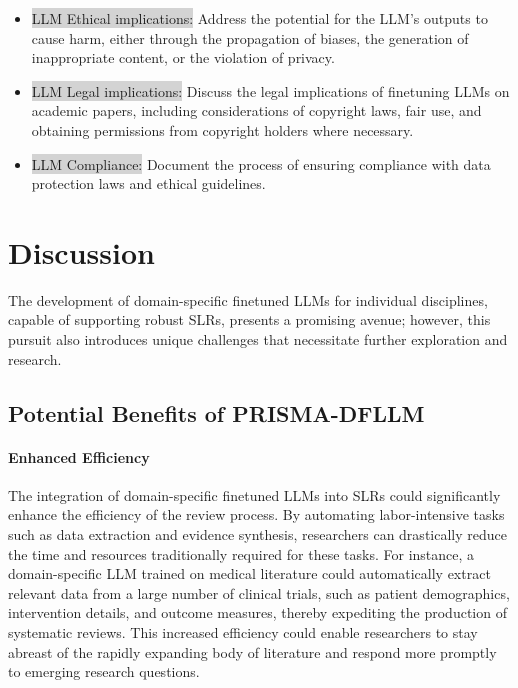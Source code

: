 \documentclass{article}
\begin{document}
\begin{enumerate}
\begin{itemize}
            \begin{itemize}
                \item[\colorbox{lightgray}{31.a}] \colorbox{lightgray}{LLM Ethical implications:} Address the potential for the LLM's outputs to cause harm, either through the propagation of biases, the generation of inappropriate content, or the violation of privacy.
                \item[\colorbox{lightgray}{31.b}] \colorbox{lightgray}{LLM Legal implications:} Discuss the legal implications of finetuning LLMs on academic papers, including considerations of copyright laws, fair use, and obtaining permissions from copyright holders where necessary.
                \item[\colorbox{lightgray}{31.c}] \colorbox{lightgray}{LLM Compliance:} Document the process of ensuring compliance with data protection laws and ethical guidelines.
\end{itemize}
        
    \end{itemize}
\end{enumerate}



\section{Discussion}

The development of domain-specific finetuned LLMs for individual disciplines, capable of supporting robust SLRs, presents a promising avenue; however, this pursuit also introduces unique challenges that necessitate further exploration and research.

\subsection{Potential Benefits of PRISMA-DFLLM}

\paragraph{Enhanced Efficiency}

The integration of domain-specific finetuned LLMs into SLRs could significantly enhance the efficiency of the review process. By automating labor-intensive tasks such as data extraction and evidence synthesis, researchers can drastically reduce the time and resources traditionally required for these tasks. For instance, a domain-specific LLM trained on medical literature could automatically extract relevant data from a large number of clinical trials, such as patient demographics, intervention details, and outcome measures, thereby expediting the production of systematic reviews. This increased efficiency could enable researchers to stay abreast of the rapidly expanding body of literature and respond more promptly to emerging research questions.
\end{document}
